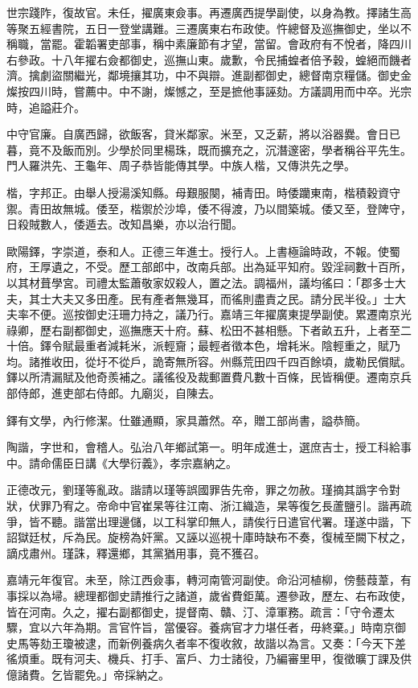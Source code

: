 \begin{pinyinscope}
世宗踐阼，復故官。未任，擢廣東僉事。再遷廣西提學副使，以身為教。擇諸生高等聚五經書院，五日一登堂講難。三遷廣東右布政使。忤總督及巡撫御史，坐以不稱職，當罷。霍韜署吏部事，稱中素廉節有才望，當留。會政府有不悅者，降四川右參政。十八年擢右僉都御史，巡撫山東。歲歉，令民捕蝗者倍予穀，蝗絕而饑者濟。擒劇盜關繼光，鄰境攘其功，中不與辯。進副都御史，總督南京糧儲。御史金燦按四川時，嘗薦中。中不謝，燦憾之，至是摭他事誣劾。方議調用而中卒。光宗時，追謚莊介。

中守官廉。自廣西歸，欲飯客，貸米鄰家。米至，又乏薪，將以浴器爨。會日已暮，竟不及飯而別。少學於同里楊珠，既而擴充之，沉潛邃密，學者稱谷平先生。門人羅洪先、王龜年、周子恭皆能傳其學。中族人楷，又傳洪先之學。

楷，字邦正。由舉人授湯溪知縣。母艱服闋，補青田。時倭躪東南，楷積穀資守禦。青田故無城。倭至，楷禦於沙埠，倭不得渡，乃以間築城。倭又至，登陴守，日殺賊數人，倭遁去。改知昌樂，亦以治行聞。

歐陽鐸，字崇道，泰和人。正德三年進士。授行人。上書極論時政，不報。使蜀府，王厚遺之，不受。歷工部郎中，改南兵部。出為延平知府。毀淫祠數十百所，以其材葺學宮。司禮太監蕭敬家奴殺人，置之法。調福州，議均徭曰：「郡多士大夫，其士大夫又多田產。民有產者無幾耳，而徭則盡責之民。請分民半役。」士大夫率不便。巡按御史汪珊力持之，議乃行。嘉靖三年擢廣東提學副使。累遷南京光祿卿，歷右副都御史，巡撫應天十府。蘇、松田不甚相懸。下者畝五升，上者至二十倍。鐸令賦最重者減耗米，派輕齎；最輕者徵本色，增耗米。陰輕重之，賦乃均。諸推收田，從圩不從戶，詭寄無所容。州縣荒田四千四百餘頃，歲勒民償賦。鐸以所清漏賦及他奇羨補之。議徭役及裁郵置費凡數十百條，民皆稱便。遷南京兵部侍郎，進吏部右侍郎。九廟災，自陳去。

鐸有文學，內行修潔。仕雖通顯，家具蕭然。卒，贈工部尚書，謚恭簡。

陶諧，字世和，會稽人。弘治八年鄉試第一。明年成進士，選庶吉士，授工科給事中。請命儒臣日講《大學衍義》，孝宗嘉納之。

正德改元，劉瑾等亂政。諧請以瑾等誤國罪告先帝，罪之勿赦。瑾摘其譌字令對狀，伏罪乃宥之。帝命中官崔杲等往江南、浙江織造，杲等復乞長蘆鹽引。諧再疏爭，皆不聽。諧當出理邊儲，以工科掌印無人，請俟行日遣官代署。瑾遂中諧，下詔獄廷杖，斥為民。旋榜為奸黨。又誣以巡視十庫時缺布不奏，復械至闕下杖之，謫戍肅州。瑾誅，釋還鄉，其黨猶用事，竟不獲召。

嘉靖元年復官。未至，除江西僉事，轉河南管河副使。命沿河植柳，傍藝葭葦，有事採以為埽。總理都御史請推行之諸道，歲省費鉅萬。遷參政，歷左、右布政使，皆在河南。久之，擢右副都御史，提督南、贛、汀、漳軍務。疏言：「守令遷太驟，宜以六年為期。言官忤旨，當優容。養病官才力堪任者，毋終棄。」時南京御史馬等劾王瓊被逮，而新例養病久者率不復收敘，故諧以為言。又奏：「今天下差徭煩重。既有河夫、機兵、打手、富戶、力士諸役，乃編審里甲，復徵曠丁課及供億諸費。乞皆罷免。」帝採納之。


\end{pinyinscope}
